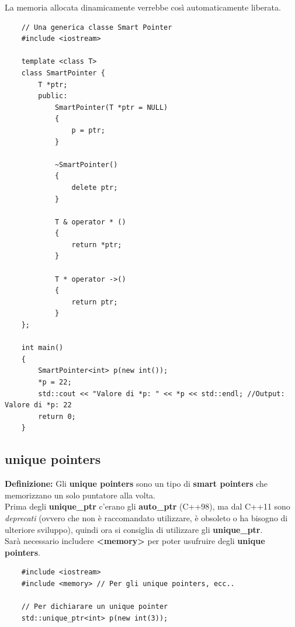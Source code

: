 \textsf{\small La memoria allocata dinamicamente verrebbe così automaticamente liberata.} \\

\begin{lstlisting}
	// Una generica classe Smart Pointer
	#include <iostream>
	
	template <class T>
	class SmartPointer {
		T *ptr;
		public:
			SmartPointer(T *ptr = NULL)
			{
				p = ptr;
			}
		
			~SmartPointer()
			{
				delete ptr;
			}
		
			T & operator * ()
			{
				return *ptr;
			}
		
			T * operator ->()
			{
				return ptr;
			}
	};

	int main()
	{
		SmartPointer<int> p(new int());
		*p = 22;
		std::cout << "Valore di *p: " << *p << std::endl; //Output: Valore di *p: 22
		return 0;
	}
\end{lstlisting}


\subsection{unique pointers}

\textsf{\small \textbf{Definizione: } Gli \textbf{unique pointers} sono un tipo di \textbf{smart pointers} che memorizzano un solo puntatore alla volta.} \\

\textsf{\small Prima degli \textbf{unique\_ptr} c'erano gli \textbf{auto\_ptr} (C++98), ma dal C++11 sono \emph{deprecati} (ovvero che non è raccomandato utilizzare, è obsoleto o ha bisogno di ulteriore sviluppo), quindi ora si consiglia di utilizzare gli \textbf{unique\_ptr}. } \\

\textsf{\small Sarà necessario includere \textbf{<memory>} per poter usufruire degli \textbf{unique pointers}.} \\

\begin{lstlisting}
	#include <iostream>
	#include <memory> // Per gli unique pointers, ecc..
	
	// Per dichiarare un unique pointer
	std::unique_ptr<int> p(new int(3));
\end{lstlisting}

